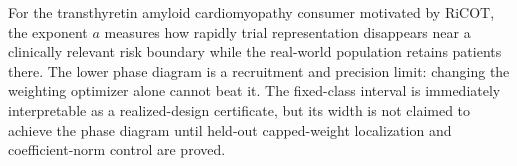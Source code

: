 For the transthyretin amyloid cardiomyopathy consumer motivated by RiCOT, the exponent \(a\) measures how rapidly trial representation disappears near a clinically relevant risk boundary while the real-world population retains patients there. The lower phase diagram is a recruitment and precision limit: changing the weighting optimizer alone cannot beat it. The fixed-class interval is immediately interpretable as a realized-design certificate, but its width is not claimed to achieve the phase diagram until held-out capped-weight localization and coefficient-norm control are proved.